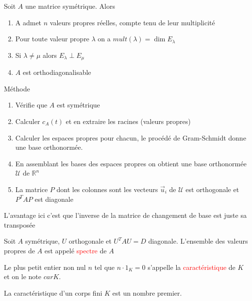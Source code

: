             \begin{theoreme}
                Soit $A$ une matrice symétrique. Alors
                \begin{enumerate}
                    \item A admet $n$ valeurs propres réelles, compte tenu de leur multiplicité
                    \item Pour toute valeur propre $\lambda$ on a $mult(\lambda) = \dim E_\lambda$
                    \item Si $\lambda \neq \mu$ alors $E_\lambda \perp E_\mu$
                    \item $A$ est orthodiagonalisable
                \end{enumerate}
            \end{theoreme}
\begin{parag}{Méthode}
\begin{enumerate}
    \item Vérifie que $A$ est symétrique
    \item Calculer $c_A(t)$ et en extraire les racines (valeurs propres)
    \item Calculer les espaces propres pour chacun, le procédé de Gram-Schmidt donne une base orthonormée.
    \item En assemblant les bases des espaces propres on obtient une base orthonormée $\mathcal{U}$ de $\mathbb{R}^n$
    \item La matrice $P$ dont les colonnes sont les vecteurs $\vec{u}_i$ de $\mathcal{U}$ est orthogonale et $P^TAP$ est diagonale
\end{enumerate}   
\begin{framedremark}
    L'avantage ici c'est que l'inverse de la matrice de changement de base est juste sa transposée
\end{framedremark}
\end{parag}
    \begin{definition}
        Soit $A$ symétrique, $U$ orthogonale et $U^TAU = D$ diagonale. L'ensemble des valeurs propres de $A$ est appelé \textcolor{red}{spectre} de $A$
    \end{definition}
    \begin{definition}
        Le plus petit entier non nul $n$ tel que $n\cdot 1_K = 0$ s'appelle la \textcolor{red}{caractéristique} de $K$ et on le note $carK$.
    \end{definition}
    \begin{theoreme}
        La caractéristique d'un corps fini $K$ est un nombre premier.
    \end{theoreme}
      
